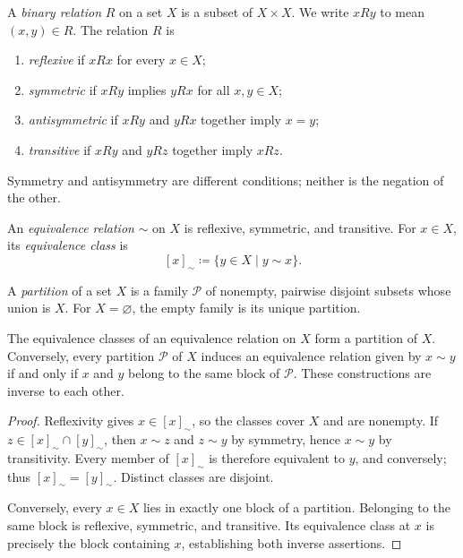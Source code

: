 \documentclass[11pt, oneside]{article}
\begin{document}
\begin{definition}
A \emph{binary relation} $R$ on a set $X$ is a subset of $X\times X$. We write $xRy$ to mean $(x, y)\in R$. The relation $R$ is
\begin{enumerate}[label=(\roman*)]
\item \emph{reflexive} if $xRx$ for every $x\in X$;
\item \emph{symmetric} if $xRy$ implies $yRx$ for all $x, y\in X$;
\item \emph{antisymmetric} if $xRy$ and $yRx$ together imply $x=y$;
\item \emph{transitive} if $xRy$ and $yRz$ together imply $xRz$.
\end{enumerate}
Symmetry and antisymmetry are different conditions; neither is the negation of the other.
\end{definition}

\begin{definition}
An \emph{equivalence relation} $\sim$ on $X$ is reflexive, symmetric, and transitive. For $x\in X$, its \emph{equivalence class} is
\[
[x]_{\sim}\coloneqq\{y\in X\mid y\sim x\}.
\]
\end{definition}

\begin{definition}[Partition]
A \emph{partition} of a set $X$ is a family $\mathcal P$ of nonempty, pairwise disjoint subsets whose union is $X$. For $X=\varnothing$, the empty family is its unique partition.
\end{definition}

\begin{theorem}\label{thm:equivpartition}
The equivalence classes of an equivalence relation on $X$ form a partition of $X$. Conversely, every partition $\mathcal P$ of $X$ induces an equivalence relation given by $x\sim y$ if and only if $x$ and $y$ belong to the same block of $\mathcal P$. These constructions are inverse to each other.
\end{theorem}
\begin{proof}
Reflexivity gives $x\in[x]_{\sim}$, so the classes cover $X$ and are nonempty. If $z\in[x]_{\sim}\cap[y]_{\sim}$, then $x\sim z$ and $z\sim y$ by symmetry, hence $x\sim y$ by transitivity. Every member of $[x]_{\sim}$ is therefore equivalent to $y$, and conversely; thus $[x]_{\sim}=[y]_{\sim}$. Distinct classes are disjoint.

Conversely, every $x\in X$ lies in exactly one block of a partition. Belonging to the same block is reflexive, symmetric, and transitive. Its equivalence class at $x$ is precisely the block containing $x$, establishing both inverse assertions.
\end{proof}
\end{document}
